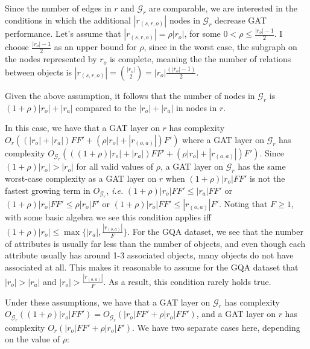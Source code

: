 Since the number of edges in \(r\) and \(\mathcal{G}_r\) are comparable, we are interested in the conditions in which the additional \(|r_{(s, r, o)}|\) nodes in \(\mathcal{G}_r\) decrease GAT performance. Let's assume that \(|r_{(s,r,o)}| = \rho |r_o|\), for some \(0 < \rho \leq \frac{|r_o| - 1}{2}\). I choose \(\frac{|r_o| - 1}{2}\) as an upper bound for \(\rho\), since in the worst case, the subgraph on the nodes represented by \(r_o\) is complete, meaning the the number of relations between objects is \(|r_{(s,r,o)}| = {|r_o| \choose 2} = |r_o|\frac{(|r_o| - 1)}{2}\).

Given the above assumption, it follows that the number of nodes in \(\mathcal{G}_r\) is \((1 + \rho)|r_o| + |r_a|\) compared to the \(|r_o| + |r_a|\) in nodes in \(r\).



In this case, we have that a GAT layer on \(r\) has complexity \(O_r\left((|r_o| + |r_a|)FF' + (\rho|r_o| + |r_{(o, a)}|)F'\right)\) where a GAT layer on \(\mathcal{G}_r\) has complexity \(O_{\mathcal{G}_r}\left(((1 + \rho)|r_o| + |r_a|)FF' + (\rho|r_o| + |r_{(o, a)}|)F'\right)\). Since \((1 + \rho)|r_o| > |r_o|\) for all valid values of \(\rho\), a GAT layer on \(\mathcal{G}_r\) has the same worst-case complexity as a GAT layer on \(r\) when \((1 + \rho)|r_o|FF'\) is not the fastest growing term in \(O_{\mathcal{G}_r}\), \textit{i.e.} \((1 + \rho)|r_o|FF' \leq |r_a|FF'\) or \((1 + \rho)|r_o|FF' \leq \rho|r_o|F'\) or \((1 + \rho)|r_o|FF' \leq |r_{(o, a)}|F'\). Noting that \(F \geq 1\), with some basic algebra we see this condition applies iff \((1 + \rho)|r_o| \leq \max\{|r_a|, \frac{|r_{(o,a)}|}{F}\}\). For the GQA dataset, we see that the number of attributes is usually far less than the number of objects, and even though each attribute usually has around 1-3 associated objects, many objects do not have associated at all. This makes it reasonable to assume for the GQA dataset that \(|r_o| > |r_a|\) and \(|r_o| > \frac{|r_{(o,a)}|}{F}\). As a result, this condition rarely holds true.

Under these assumptions, we have that a GAT layer on \(\mathcal{G}_r\) has complexity \(O_{\mathcal{G}_r}((1 + \rho)|r_o|FF') = O_{\mathcal{G}_r}(|r_o|FF' + \rho|r_o|FF')\), and a GAT layer on \(r\) has complexity  \(O_r(|r_o|FF' + \rho|r_o|F')\). We have two separate cases here, depending on the value of \(\rho\):

